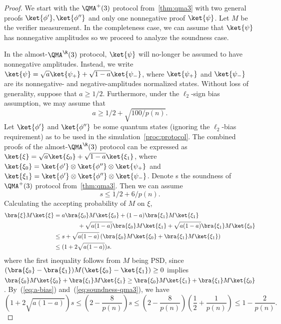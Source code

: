 \begin{proof}
  We start with the $\QMA^+(3)$ protocol from~\cref{thm:qma3} with two general proofs $\ket{\phi'},\ket{\phi''}$
  and only one nonnegative proof $\ket{\psi}$. Let $M$ be the verifier measurement.
  In the completeness case, we can assume that $\ket{\psi}$ has nonnegative amplitudes so we proceed
  to analyze the soundness case.

  In the \textup{almost}-$\QMA^\R(3)$ protocol, $\ket{\psi}$ will no-longer be assumed to have nonnegative
  amplitudes. Instead, we write  $\ket{\psi} = \sqrt{a} \ket{\psi_+} + \sqrt{1-a} \ket{\psi_{-}}$,
  where $\ket{\psi_+}$ and $\ket{\psi_{-}}$ are its nonnegative- and negative-amplitudes normalized states.
  Without loss of generality, suppose that $a \ge 1/2$.
  Furthermore, under the $\ell_2$-sign bias assumption, we may assume that 
  \begin{equation}\label{eq:a-bias}
      a \ge 1/2 + \sqrt{100/p(n)}.
  \end{equation}
  Let $\ket{\phi'}$ and $\ket{\phi''}$ be some quantum states (ignoring the $\ell_2$-bias requirement) as to be used in the simulation~\cref{proc:protocol}.
  The combined proofs of the \textup{almost}-$\QMA^\R(3)$ protocol can be expressed as $\ket{\xi} = \sqrt{a} \ket{\xi_0} + \sqrt{1-a} \ket{\xi_1}$, where
  $\ket{\xi_0} = \ket{\phi'} \otimes \ket{\phi''} \otimes \ket{\psi_+}$ and $\ket{\xi_1} = \ket{\phi'} \otimes \ket{\phi''} \otimes \ket{\psi_{-}}$. 
  Denote s the soundness of $\QMA^+(3)$ protocol from~\cref{thm:qma3}. Then we can assume 
  \begin{equation}\label{eq:soundness-qma3}
  s \le 1/2 + 6/p(n).
  \end{equation}
  Calculating the accepting probability of $M$ on $\xi$,
  \begin{align}
    \bra{\xi} M \ket{\xi} 
        &= a \bra{\xi_0} M \ket{\xi_0} + (1-a) \bra{\xi_1} M \ket{\xi_1} \nonumber \\
        &\qquad\qquad +\sqrt{a(1-a)} \bra{\xi_0} M \ket{\xi_1} + 
        \sqrt{a(1-a)} \bra{\xi_1} M \ket{\xi_0}
        \nonumber \\
        &\le s + \sqrt{a(1-a)} \left(\bra{\xi_0} M \ket{\xi_0} + \bra{\xi_1} M \ket{\xi_1}\right) 
        \nonumber\\
        &\le (1+ 2\sqrt{a(1-a)})s. \label{eq:soundness-almost-qma}
  \end{align}
  where the first inequality follows from $M$ being PSD, \ie since $(\bra{\xi_0}-\bra{\xi_1}) M (\ket{\xi_0}-\ket{\xi_1}) \ge 0$
  implies $\bra{\xi_0} M \ket{\xi_0} + \bra{\xi_1} M \ket{\xi_1} \ge \bra{\xi_0} M \ket{\xi_1} + \bra{\xi_1} M \ket{\xi_0}$.
  By~(\ref{eq:a-bias}) and~(\ref{eq:soundness-qma3}), we have
    \[ 
  (1+ 2\sqrt{a(1-a)})s \le \left(2- \frac{8}{p(n)}\right) s \le\left(2- \frac{8}{p(n)}\right) \left(\frac{1}{2} + \frac{1}{p(n)}\right) \le 1 - \frac{2}{p(n)}.
    \] 
    


\end{proof}
